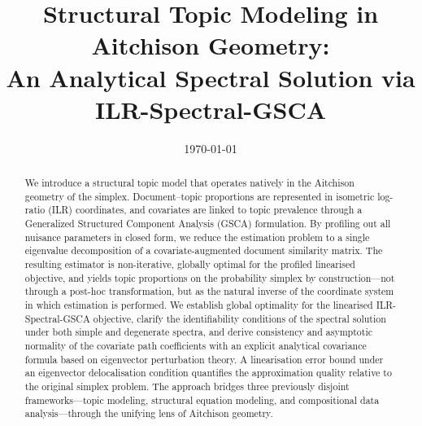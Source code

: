 \documentclass{article}
\begin{document}
\title{Structural Topic Modeling in Aitchison Geometry:\\
  An Analytical Spectral Solution via ILR-Spectral-GSCA}
\date{\today}
\maketitle

\begin{abstract}
We introduce a structural topic model that operates natively in the
Aitchison geometry of the simplex. Document--topic proportions are
represented in isometric log-ratio (ILR) coordinates, and covariates are
linked to topic prevalence through a Generalized Structured Component
Analysis (GSCA) formulation. By profiling out all nuisance parameters in
closed form, we reduce the estimation problem to a single eigenvalue
decomposition of a covariate-augmented document similarity matrix.
The resulting estimator is non-iterative, globally optimal for the
profiled linearised objective, and yields topic proportions on the
probability simplex by construction---not through a post-hoc
transformation, but as the natural inverse of the coordinate system in
which estimation is performed. We establish global optimality for the
linearised ILR-Spectral-GSCA objective, clarify the identifiability conditions
of the spectral solution under both simple and degenerate spectra, and
derive consistency and asymptotic normality of the covariate path
coefficients with an explicit analytical covariance formula based on
eigenvector perturbation theory. A linearisation error bound under an
eigenvector delocalisation condition quantifies the approximation quality
relative to the original simplex problem. The approach bridges three
previously disjoint frameworks---topic modeling, structural equation
modeling, and compositional data analysis---through the unifying lens of
Aitchison geometry.
\end{abstract}










\end{document}
